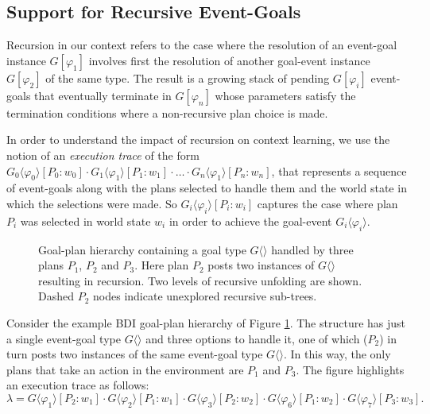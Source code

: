 \subsection{Support for Recursive Event-Goals}

Recursion in our context refers to the case where the resolution of an event-goal instance $G[\varphi_1]$ involves first the resolution of another goal-event instance $G[\varphi_2]$ of the same type. The result is a growing stack of pending $G[\varphi_i]$ event-goals that eventually terminate in $G[\varphi_n]$ whose parameters satisfy the termination conditions where a non-recursive plan choice is made.

In order to understand the impact of recursion on context learning, we use the notion of an \textit{execution trace} of the form $G_0\langle\varphi_0\rangle[P_0:w_0] \cdot G_1\langle\varphi_1\rangle[P_1:w_1] \cdot \ldots \cdot G_n\langle\varphi_1\rangle[P_n:w_n]$, that represents a sequence of event-goals along with the plans selected to handle them and the world state in which the selections were made. So $G_i\langle\varphi_i\rangle[P_i:w_i]$ captures the case where plan $P_i$ was selected in world state $w_i$ in order to achieve the goal-event $G_i\langle\varphi_i\rangle$.

\begin{figure}[t]
\begin{center}
\resizebox{0.8\textwidth}{!}{

}
\end{center}
\caption{Goal-plan hierarchy containing a goal type $G\langle\rangle$ handled by three plans $P_1$, $P_2$ and $P_3$. Here plan $P_2$ posts two instances of $G\langle\rangle$ resulting in recursion. Two levels of recursive unfolding are shown. Dashed $P_2$ nodes indicate unexplored recursive sub-trees.}
\label{fig:unfolding}
\end{figure}

Consider the example BDI goal-plan hierarchy of Figure \ref{fig:unfolding}. The structure has just a single event-goal type $G\langle\rangle$ and three options to handle it, one of which ($P_2$) in turn posts two instances of the same event-goal type $G\langle\rangle$. In this way, the only plans that take an action in the environment are $P_1$ and $P_3$. The figure highlights an execution trace as follows: \[
\lambda=G\langle\varphi_1\rangle[P_2:w_1] \cdot G\langle\varphi_2\rangle[P_1:w_1] \cdot G\langle\varphi_3\rangle[P_2:w_2] \cdot G\langle\varphi_6\rangle[P_1:w_2] \cdot G\langle\varphi_7\rangle[P_3:w_3].
\]

